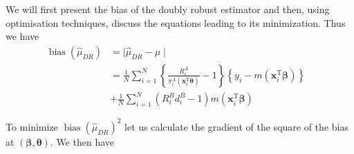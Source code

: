 \documentclass[
]{jss}
\begin{document}
We will first present the bias of the doubly robust estimator and then,
using optimisation techniques, discuss the equations leading to its
minimization. Thus we have \begin{equation}
\begin{aligned}
\operatorname{bias}\left(\hat{\mu}_{D R}\right) & = \mid\hat{\mu}_{DR}-\mu\mid& \\
& =\frac{1}{N} \sum_{i=1}^N\left\{\frac{R_i^A}{\pi_i^A\left(\boldsymbol{x}_i^{\mathrm{T}} \boldsymbol{\theta}\right)}-1\right\}\left\{y_i-m\left(\boldsymbol{x}_i^{\mathrm{T}} \boldsymbol{\beta}\right)\right\}\\
& + \frac{1}{N} \sum_{i=1}^N\left(R_i^B d_i^B-1\right) m\left(\boldsymbol{x}_i^{\mathrm{T}} \boldsymbol{\beta}\right)
\end{aligned}
\end{equation}

To minimize \(\operatorname{bias}\left(\hat{\mu}_{D R}\right)^2\) let us
calculate the gradient of the square of the bias at
\(\left(\boldsymbol{\beta}, \boldsymbol{\theta}\right)\). We then have
\end{document}
